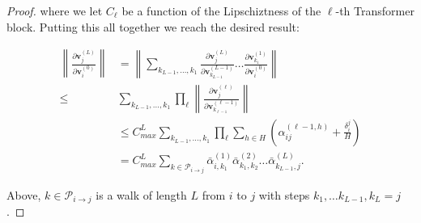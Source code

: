 \documentclass{article} %
\newcommand{\vb}{\mathbf{v}}
\begin{document}
\begin{proof}
where we let $C_\ell$ be a function of the Lipschiztness of the $\ell$-th Transformer block. Putting this all together we reach the desired result:

\begin{align*}
    \left \lVert \frac{\partial \vb_j^{(L)}}{\partial \vb_i^{(0)}} \right \rVert &=  \left \lVert \sum_{k_{L-1}, \dots, k_1} \frac{\partial \vb^{(L)}_j}{\partial \vb^{(L-1)}_{k_{L-1}}} \dots \frac{\partial \vb^{(1)}_{k_{1}}}{\partial \vb^{(0)}_{i}} \right \rVert \\
    \leq& \sum_{k_{L-1}, \dots, k_1} \prod_{\ell} \left \lVert\frac{\partial \vb^{(\ell)}_j}{\partial \vb^{(\ell-1)}_{k_{\ell-1}}} \right \rVert \\
    &\leq C^L_{max} \sum_{k_{L-1}, \dots, k_1} \prod_{\ell}  \sum_{h \in H} \left(\alpha_{ij}^{(\ell -1 ,h)} + \frac{\delta_i^j}{H} \right) \\
    &= C^L_{max} \sum_{k \in \mathcal{P}_{i \to j}}  \bar{\alpha}^{(1)}_{i, k_1} \bar{\alpha}^{(2)}_{k_1, k_2} \dots \bar{\alpha}^{(L)}_{k_{L-1}, j}.
\end{align*}

Above, $k \in \mathcal{P}_{i \to j}$ is a walk of length $L$ from $i$ to $j$ with steps $k_1, \dots k_{L-1}, k_L = j$.

\end{proof}
\end{document}
